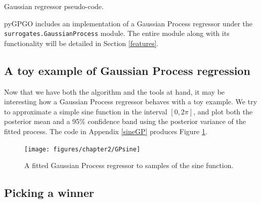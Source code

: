 \documentclass[10pt,a4paper,twoside]{book}
\begin{document}
\begin{algorithm}
	\caption{Gaussian regressor pseudo-code.}
		\label{alg}
		\begin{algorithmic}[1]
			\EndFunction
		\end{algorithmic}
\end{algorithm}

pyGPGO includes an implementation of a Gaussian Process regressor under the \texttt{surrogates.GaussianProcess} module. The entire module along with its functionality will be detailed in Section \ref{features}.

\subsection{A toy example of Gaussian Process regression}

Now that we have both the algorithm and the tools at hand, it may be interesting how a Gaussian Process regressor behaves with a toy example. We try to approximate a simple sine function in the interval $[0, 2\pi]$, and plot both the posterior mean and a 95\% confidence band using the posterior variance of the fitted process. The code in Appendix \ref{sineGP} produces Figure \ref{fig:GPsine}.\\


\begin{figure}
\caption{A fitted Gaussian Process regressor to samples of the sine function.}
\label{fig:GPsine}
\texttt{[image: figures/chapter2/GPsine]}
\end{figure}

\subsection{Picking a winner}
\end{document}
